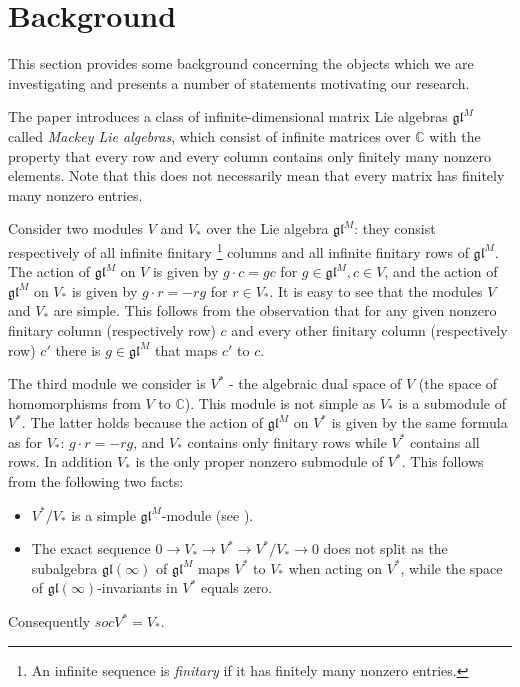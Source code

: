 \documentclass[letterpaper,11pt]{article}
\begin{document}
	\section{Background}

	This section provides some background concerning the objects which we are investigating and presents a number of statements motivating our research.

	The paper \cite{introduction1} introduces a class of infinite-dimensional matrix Lie algebras $\mathfrak{gl}^M$ called \textit{Mackey Lie algebras}, which consist of infinite matrices over $\mathbb{C}$ with the property that every row and every column contains only finitely many nonzero elements. Note that this does not necessarily mean that every matrix has finitely many nonzero entries. 
	
	Consider two modules $V$ and $V_*$ over the Lie algebra $\mathfrak{gl}^M$: they consist respectively of all infinite finitary \footnote{An infinite sequence is \textit{finitary} if it has finitely many nonzero entries.} columns and all infinite finitary rows of $\mathfrak{gl}^M$. The action of $\mathfrak{gl}^M$ on $V$ is given by $g \cdot c = gc$ for $ g \in \mathfrak{gl}^M, c \in V$, and the action of $\mathfrak{gl}^M$ on $V_*$ is given by $g \cdot r = -rg$ for $ r \in V_*$. It is easy to see that the modules $V$ and $V_*$ are simple. This follows from the observation that for any given nonzero finitary column (respectively row) $c$ and every other finitary column (respectively row) $c'$ there is $g \in \mathfrak{gl}^M$ that maps $c'$ to $c$. 
	
	The third module we consider is $V^*$ - the algebraic dual space of $V$ (the space of homomorphisms from $V$ to  $\mathbb{C}$). This module is not simple as $V_*$ is a submodule of $V^*$. The latter holds because the action of $\mathfrak{gl}^M$ on $V^*$ is given by the same formula as for $V_*$: $g \cdot r = -rg$, and $V_*$ contains only finitary rows while $V^*$ contains all rows. In addition $V_*$ is the only proper nonzero submodule of $V^*$. 
	This follows from the following two facts: 
	\begin{itemize}
		\item $V^*/V_*$ is a simple $\mathfrak{gl}^M$-module (see \cite{mackey}).
		\item The exact sequence $0 \rightarrow V_* \rightarrow V^* \rightarrow V^*/V_* \rightarrow 0$ does not split as the subalgebra $\mathfrak{gl}(\infty)$ of $\mathfrak{gl}^M$ maps $V^*$ to $V_*$ when acting on $V^*$, while the space of  $\mathfrak{gl}(\infty)$-invariants in $V^*$ equals zero.
	\end{itemize}
	Consequently $socV^* = V_*$.
	
\end{document}

